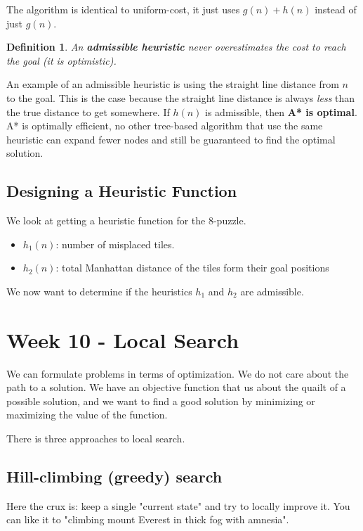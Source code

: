 \documentclass{article}
\newtheorem{definition}{Definition}[section]
\begin{document}
The algorithm is identical to uniform-cost, it just uses $g(n) + h(n)$ instead
of just $g(n)$\cite[p. 93]{book:artificial_intelligence_modern_approach}.

\begin{definition}
  An \textbf{admissible heuristic} never overestimates the cost to reach the
  goal (it is optimistic). 
\end{definition}
An example of an admissible heuristic is using the straight line distance from
$n$ to the goal. This is the case because the straight line distance is always
\emph{less} than the true distance to get somewhere. If $h(n)$ is admissible,
then \textbf{A* is optimal}\cite[p. 21]{presentation:informed_search}.
A* is optimally efficient, no other tree-based algorithm that use the same
heuristic can expand fewer nodes and still be guaranteed to find the optimal
solution.

\subsection{Designing a Heuristic Function}%
\label{sub:designing_a_heuristic_function}

We look at getting a heuristic function for the 8-puzzle.
\begin{itemize}
  \item $h_1(n)$: number of misplaced tiles.
  \item $h_2(n)$: total Manhattan distance of the tiles form their goal
    positions
\end{itemize}

We now want to determine if the heuristics $h_1$ and $h_2$ are admissible.


\newpage
\section{Week 10 - Local Search}
We can formulate problems in terms of optimization. We do not care about the
path to a solution. We have an objective function that us about the quailt of a
possible solution, and we want to find a good solution by minimizing or
maximizing the value of the function.

There is three approaches to local search.

\subsection{Hill-climbing (greedy) search}
Here the crux is: keep a single "current state" and try to locally improve it.
You can like it to "climbing mount Everest in thick fog with amnesia".
\end{document}
